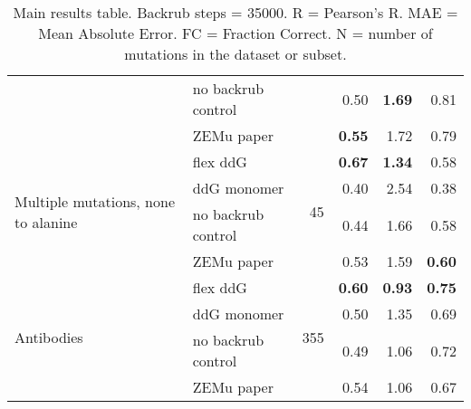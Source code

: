 \begin{table}
\begin{tabular}{llrrrr}
 & no backrub control & & 0.50 & \textbf{1.69} & 0.81  \\
 & ZEMu paper & & \textbf{0.55} & 1.72 & 0.79  \\
\hline
 \multirow{ 4}{*}{Multiple mutations, none to alanine} & flex ddG & \multirow{ 4}{*}{45} & \textbf{0.67} & \textbf{1.34} & 0.58  \\
 & ddG monomer & & 0.40 & 2.54 & 0.38  \\
 & no backrub control & & 0.44 & 1.66 & 0.58  \\
 & ZEMu paper & & 0.53 & 1.59 & \textbf{0.60}  \\
\hline
 \multirow{ 4}{*}{Antibodies} & flex ddG & \multirow{ 4}{*}{355} & \textbf{0.60} & \textbf{0.93} & \textbf{0.75}  \\
 & ddG monomer & & 0.50 & 1.35 & 0.69  \\
 & no backrub control & & 0.49 & 1.06 & 0.72  \\
 & ZEMu paper & & 0.54 & 1.06 & 0.67  \\
\bottomrule
\end{tabular}
  \caption[]{
    Main results table. Backrub steps = 35000. R = Pearson's R. MAE = Mean Absolute Error. FC = Fraction Correct. N = number of mutations in the dataset or subset.
  } \label{tab:table-main}
\end{table}
